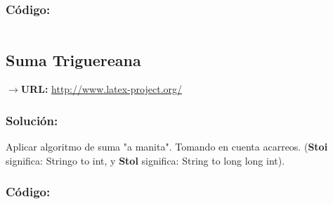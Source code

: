 \documentclass[12pt]{article}
\begin{document}
            \subsubsection{Código:}
                \inputminted{cpp}{Code/MMM.cpp}
                
          \subsection{Suma Triguereana}
            $\rightarrow$\textbf{URL: }\url{http://www.latex-project.org/}
            
            \subsubsection{Solución:}
                Aplicar algoritmo de suma "a manita". Tomando en cuenta acarreos. (\textbf{Stoi} significa: Stringo to int, y \textbf{Stol} significa: String to long long int).
            
            \subsubsection{Código:}
                \inputminted{cpp}{Code/suma.cpp}
        
        
        
        
    
    
\end{document}
